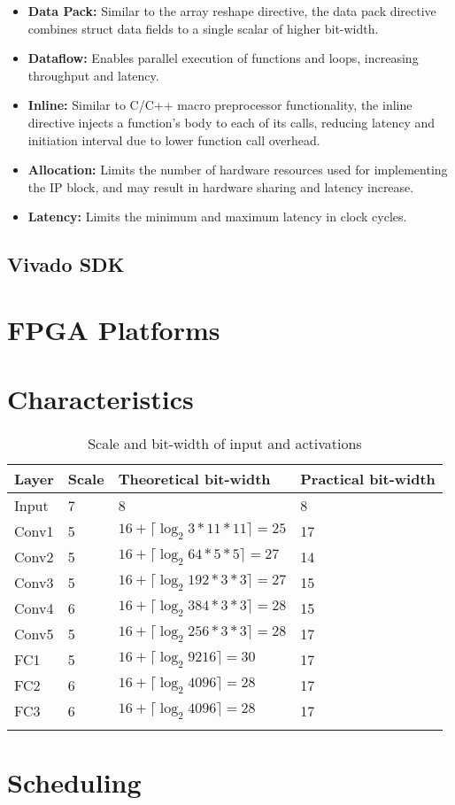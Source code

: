 \begin{itemize}
	\item \textbf{Data Pack:} Similar to the array reshape directive, the data pack directive combines struct data fields to a single scalar of higher bit-width.
	\item \textbf{Dataflow:} Enables parallel execution of functions and loops, increasing throughput and latency.
	\item \textbf{Inline:} Similar to C/C++ macro preprocessor functionality, the inline directive injects a function's body to each of its calls, reducing latency and initiation interval due to lower function call overhead.
	\item \textbf{Allocation:} Limits the number of hardware resources used for implementing the IP block, and may result in hardware sharing and latency increase.
	\item \textbf{Latency:} Limits the minimum and maximum latency in clock cycles.
\end{itemize}

\subsection{Vivado SDK}

\section{FPGA Platforms}

\section{Characteristics}

\begin{table}[H]
	\caption{Scale and bit-width of input and activations}
	\label{tab:scale-and-bit-width-of-input-and-activations}
	\centering
	\begin{tabular}{llll}
		\toprule
		\textbf{Layer} & \textbf{Scale} & \textbf{Theoretical bit-width} & \textbf{Practical bit-width}\\
		\midrule
			Input & 7 & 8 & 8\\
			Conv1 & 5 & $16 + \lceil \log_2 3 * 11 * 11 \rceil = 25 $ & 17\\
			Conv2 & 5 & $16 + \lceil \log_2 64 * 5 * 5 \rceil = 27$ & 14\\
			Conv3 & 5 & $16 + \lceil \log_2 192 * 3 * 3 \rceil = 27$ & 15\\
			Conv4 & 6 & $16 + \lceil \log_2 384 * 3 * 3 \rceil = 28$ & 15\\
			Conv5 & 5 & $16 + \lceil \log_2 256 * 3 * 3 \rceil = 28$ & 17\\
			FC1 & 5 & $16 + \lceil \log_2 9216 \rceil = 30$ & 17\\
			FC2 & 6 & $16 + \lceil \log_2 4096 \rceil = 28$ & 17\\
			FC3 & 6 & $16 + \lceil \log_2 4096 \rceil = 28$ & 17\\
		\bottomrule\\
	\end{tabular}
\end{table}

\section{Scheduling}
